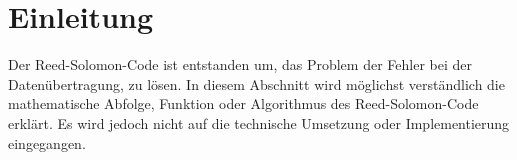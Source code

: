 %
%
%
\section{Einleitung
\label{reedsolomon:section:einleitung}}
Der Reed-Solomon-Code ist entstanden um,
das Problem der Fehler bei der Datenübertragung, zu lösen.
In diesem Abschnitt wird möglichst verständlich die mathematische Abfolge, 
Funktion oder Algorithmus des Reed-Solomon-Code erklärt.
Es wird jedoch nicht auf die technische Umsetzung oder Implementierung eingegangen.





